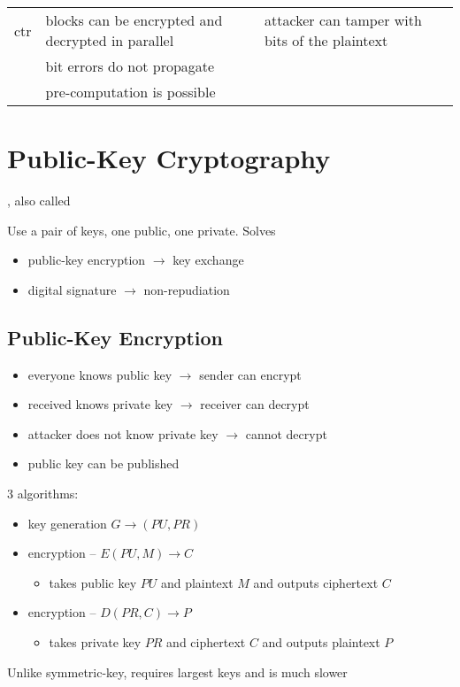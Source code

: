\documentclass[draft]{article}
\begin{document}
\begin{center}
\begin{tabular}{lp{}p{}}
        \acrshort{ctr}                  & blocks can be encrypted and decrypted in parallel    & attacker can tamper with bits of the plaintext                       \\\cmidrule{2-3}
                                        & bit errors do not propagate                          &                                                                      \\\cmidrule{2-2}
                                        & pre-computation is possible                          &                                                                      \\\bottomrule
    \end{tabular}
\end{center}
\section{Public-Key Cryptography}
, also called 

Use a pair of keys, one public, one private. Solves
\begin{itemize}[nosep]
    \item public-key encryption $\rightarrow$ key exchange
    \item digital signature $\rightarrow$ non-repudiation
\end{itemize}
\subsection{Public-Key Encryption}
\begin{itemize}[nosep]
    \item everyone knows public key $\rightarrow$ sender can encrypt
    \item received knows private key $\rightarrow$ receiver can decrypt
    \item attacker does not know private key $\rightarrow$ cannot decrypt
    \item public key can be published
\end{itemize}
3 algorithms:
\begin{itemize}[nosep]
    \item key generation $G \rightarrow (PU, PR)$
    \item encryption -- $E(PU, M) \rightarrow C$
          \begin{itemize}[nosep]\item takes public key $PU$ and plaintext $M$ and outputs ciphertext $C$\end{itemize}
    \item encryption -- $D(PR, C) \rightarrow P$
          \begin{itemize}[nosep]\item takes private key $PR$ and ciphertext $C$ and outputs plaintext $P$\end{itemize}
\end{itemize}
Unlike symmetric-key, requires largest keys and is much slower
\end{document}
